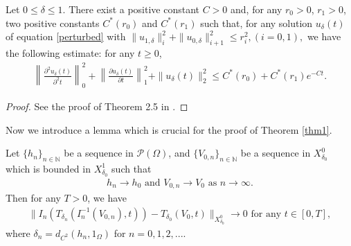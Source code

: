 \documentclass[11pt]{amsart}
\begin{document}
\begin{lemma}\label{theo21}
    Let $0\leq \delta\leq 1$. There exist a positive constant $C>0$ and, for any $r_0>0$, $r_1>0$, two positive constants $C^*(r_0)$ and $C^*(r_1)$ such that, for any solution $u_\delta(t)$ of equation \eqref{perturbed} with $\|u_{1,\delta}\|^2_i + \|u_{0,\delta}\|^2_{i+1} \leq r_i ^2, (i=0,1),$ we have the following estimate: for any $t\geq 0$,
    \begin{align*}
        \left\|\frac{\partial^2 u_\delta (t)}{\partial^2 t}\right\|^2_0 +\left\|\frac{\partial u_\delta (t)}{\partial t}\right\|^2_1 + \|u_\delta(t)\|^2_2 \leq C^*(r_0)+ C^*(r_1)e^{-C t}.
    \end{align*}
\end{lemma}


\begin{proof}
    See the proof of Theorem 2.5 in \cite{HR1}.
\end{proof}

Now we introduce a lemma which is crucial for the proof of Theorem \ref{thm1}.
\begin{lemma}\label{lem in}
    Let $\{h_n\}_{n\in \mathbb{N}}$ be a sequence in $\mathcal P(\Omega)$, and $\{V_{0,n}\}_{n\in \mathbb{N}}$ be a sequence in $X^0_{\delta_0}$  which is bounded in $X^1_{\delta_0}$ such that
    \begin{align*}
        h_n \rightarrow h_0 \mbox{ and } V_{0,n}\rightarrow V_0 \mbox{ as } n\rightarrow \infty.
    \end{align*}
    Then for any $T>0$, we have
    \begin{align*}
        \|I_n(T_{\delta_n}(I_n^{-1}(V_{0,n}),t))-T_{\delta_0}(V_0, t)\|_{X^0_{\delta_0}}\rightarrow 0 \mbox{ for any } t\in [0, T],
    \end{align*}
    where $\delta_n = d_{C^2}(h_n, 1_\Omega)$ for $n = 0,1,2,...$. 
\end{lemma}
\end{document}
